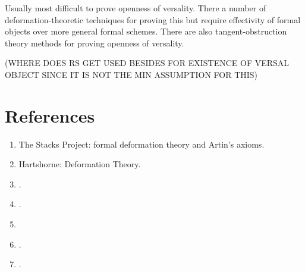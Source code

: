 \documentclass[12pt]{article}
\begin{document}
\begin{rmk}
Usually most difficult to prove openness of versality. There a number of deformation-theoretic techniques for proving this but require effectivity of formal objects over more general formal schemes. There are also tangent-obstruction theory methods for proving openness of versality.
\end{rmk}

(WHERE DOES RS GET USED BESIDES FOR EXISTENCE OF VERSAL OBJECT SINCE IT IS NOT THE MIN ASSUMPTION FOR THIS)

\section{References}

\begin{enumerate}
\item The Stacks Project: formal deformation theory and Artin's axioms.

\item Hartshorne: Deformation Theory.

\item {}.

\item {}.

\item {}

\item {}. 

\item {}.
\end{enumerate}
\end{document}
